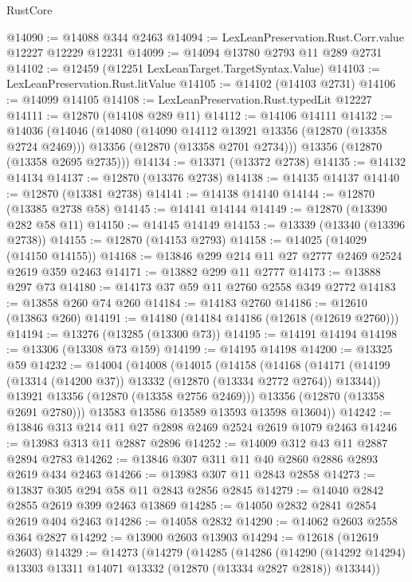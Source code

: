 \begin{lexlean}{RustCore}
\begin{coremodule}
@14090 := @14088 @344 @2463
@14094 := LexLeanPreservation.Rust.Corr.value @12227 @12229 @12231
@14099 := @14094 @13780 @2793 @11 @289 @2731
@14102 := @12459 (@12251 LexLeanTarget.TargetSyntax.Value)
@14103 := LexLeanPreservation.Rust.litValue
@14105 := @14102 (@14103 @2731)
@14106 := @14099 @14105
@14108 := LexLeanPreservation.Rust.typedLit @12227
@14111 := @12870 (@14108 @289 @11)
@14112 := @14106 @14111
@14132 := @14036
    (@14046
      (@14080
        (@14090 @14112 @13921 @13356 (@12870 (@13358 @2724 @2469)))
        @13356
        (@12870 (@13358 @2701 @2734)))
      @13356
      (@12870 (@13358 @2695 @2735)))
@14134 := @13371 (@13372 @2738)
@14135 := @14132 @14134
@14137 := @12870 (@13376 @2738)
@14138 := @14135 @14137
@14140 := @12870 (@13381 @2738)
@14141 := @14138 @14140
@14144 := @12870 (@13385 @2738 @58)
@14145 := @14141 @14144
@14149 := @12870 (@13390 @282 @58 @11)
@14150 := @14145 @14149
@14153 := @13339 (@13340 (@13396 @2738))
@14155 := @12870 (@14153 @2793)
@14158 := @14025 (@14029 (@14150 @14155))
@14168 := @13846 @299 @214 @11 @27 @2777 @2469 @2524 @2619 @359 @2463
@14171 := @13882 @299 @11 @2777
@14173 := @13888 @297 @73
@14180 := @14173 @37 @59 @11 @2760 @2558 @349 @2772
@14183 := @13858 @260 @74 @260
@14184 := @14183 @2760
@14186 := @12610 (@13863 @260)
@14191 := @14180 (@14184 @14186 (@12618 (@12619 @2760)))
@14194 := @13276 (@13285 (@13300 @73))
@14195 := @14191 @14194
@14198 := @13306 (@13308 @73 @159)
@14199 := @14195 @14198
@14200 := @13325 @59
@14232 := @14004
    (@14008
      (@14015
        (@14158
          (@14168
            (@14171 (@14199 (@13314 (@14200 @37)) @13332 (@12870 (@13334 @2772 @2764)) @13344))
            @13921
            @13356
            (@12870 (@13358 @2756 @2469)))
          @13356
          (@12870 (@13358 @2691 @2780)))
        @13583
        @13586
        @13589
        @13593
        @13598
        @13604))
@14242 := @13846 @313 @214 @11 @27 @2898 @2469 @2524 @2619 @1079 @2463
@14246 := @13983 @313 @11 @2887 @2896
@14252 := @14009 @312 @43 @11 @2887 @2894 @2783
@14262 := @13846 @307 @311 @11 @40 @2860 @2886 @2893 @2619 @434 @2463
@14266 := @13983 @307 @11 @2843 @2858
@14273 := @13837 @305 @294 @58 @11 @2843 @2856 @2845
@14279 := @14040 @2842 @2855 @2619 @399 @2463 @13869
@14285 := @14050 @2832 @2841 @2854 @2619 @404 @2463
@14286 := @14058 @2832
@14290 := @14062 @2603 @2558 @364 @2827
@14292 := @13900 @2603 @13903
@14294 := @12618 (@12619 @2603)
@14329 := @14273
    (@14279
      (@14285
        (@14286
          (@14290 (@14292 @14294) @13303 @13311 @14071 @13332 (@12870 (@13334 @2827 @2818)) @13344))

\end{coremodule}
\end{lexlean}

